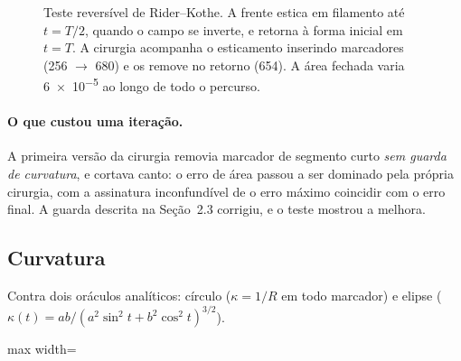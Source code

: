 \begin{figure}[htbp]
\centering
{}
\caption{Teste revers\'ivel de Rider--Kothe. A frente estica em filamento at\'e
$t=T/2$, quando o campo se inverte, e retorna \`a forma inicial em $t=T$. A
cirurgia acompanha o esticamento inserindo marcadores (256 $\to$ 680) e os
remove no retorno (654). A \'area fechada varia \num{6e-5} ao longo de todo o
percurso.}
\label{fig:b1}
\end{figure}

\paragraph{O que custou uma itera\c{c}\~ao.} A primeira vers\~ao da cirurgia
removia marcador de segmento curto \emph{sem guarda de curvatura}, e cortava
canto: o erro de \'area passou a ser dominado pela pr\'opria cirurgia, com a
assinatura inconfund\'ivel de o erro m\'aximo coincidir com o erro final. A
guarda descrita na Se\c{c}\~ao~2.3 corrigiu, e o teste mostrou a melhora.

\subsection{Curvatura}

Contra dois or\'aculos anal\'iticos: c\'irculo ($\kappa=1/R$ em todo marcador) e
elipse ($\kappa(t) = ab/(a^{2}\sin^{2}t + b^{2}\cos^{2}t)^{3/2}$).

\begin{adjustbox}{max width=\linewidth}
\end{adjustbox}

